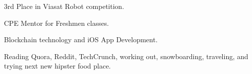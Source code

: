  
\begin{cventriesaward}

\cventryaward
{
\begin{cvitems}
\item {3rd Place in Viasat Robot competition.}
\item {CPE Mentor for Freshmen classes.}
\item {Blockchain technology and iOS App Development.}
\item {Reading Quora, Reddit, TechCrunch, working out, snowboarding, traveling, and trying next new hipster food place.}
\end{cvitems}
}

\end{cventriesaward}














